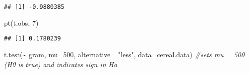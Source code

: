 \documentclass[
]{article}
\newenvironment{Shaded}{\begin{snugshade}}{\end{snugshade}}
\newcommand{\AttributeTok}[1]{\textcolor[rgb]{0.77,0.63,0.00}{#1}}
\newcommand{\CommentTok}[1]{\textcolor[rgb]{0.56,0.35,0.01}{\textit{#1}}}
\newcommand{\DecValTok}[1]{\textcolor[rgb]{0.00,0.00,0.81}{#1}}
\newcommand{\FloatTok}[1]{\textcolor[rgb]{0.00,0.00,0.81}{#1}}
\newcommand{\FunctionTok}[1]{\textcolor[rgb]{0.00,0.00,0.00}{#1}}
\newcommand{\NormalTok}[1]{#1}
\newcommand{\OtherTok}[1]{\textcolor[rgb]{0.56,0.35,0.01}{#1}}
\newcommand{\SpecialCharTok}[1]{\textcolor[rgb]{0.00,0.00,0.00}{#1}}
\newcommand{\StringTok}[1]{\textcolor[rgb]{0.31,0.60,0.02}{#1}}
\begin{document}
\begin{Shaded}
\end{Shaded}

\begin{verbatim}
## [1] -0.9880385
\end{verbatim}

\begin{Shaded}
\begin{Highlighting}[]
\FunctionTok{pt}\NormalTok{(t.obs, }\DecValTok{7}\NormalTok{)}
\end{Highlighting}
\end{Shaded}

\begin{verbatim}
## [1] 0.1780239
\end{verbatim}

\begin{Shaded}
\begin{Highlighting}[]
\FunctionTok{t.test}\NormalTok{(}\SpecialCharTok{\textasciitilde{}}\NormalTok{ gram, }\AttributeTok{mu=}\DecValTok{500}\NormalTok{, }\AttributeTok{alternative=} \StringTok{"less"}\NormalTok{, }\AttributeTok{data=}\NormalTok{cereal.data) }\CommentTok{\#sets mu = 500 (H0 is true) and indicates sign in Ha}
\end{Highlighting}
\end{Shaded}
\end{document}

